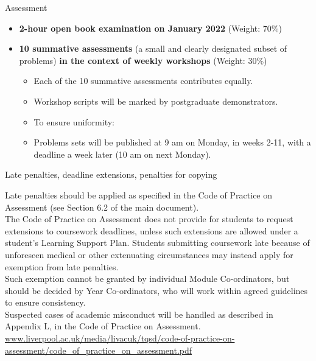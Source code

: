 \begin{frame}{Assessment}

     \begin{itemize}
        \item {\bf 2-hour open book examination on January 2022} {\color{red}(Weight: 70\%)}
        \vspace{0.2cm}
        \item {\bf 10 summative assessments} (a small and
            clearly designated subset of problems) {\bf in the context of weekly workshops} {\color{red}(Weight: 30\%)}
            \begin{itemize}
              \item Each of the 10 summative assessments contributes equally.
              \item Workshop scripts will be marked by postgraduate demonstrators.
              \item To ensure uniformity:
              \item Problems sets will be published at 9 am on Monday, in weeks 2-11, with a deadline a week later (10 am on next Monday).
            \end{itemize}
     \end{itemize}

     \begin{block001}{Late penalties, deadline extensions, penalties for copying}
     \begin{center}
     {\tiny
     Late penalties should be applied as specified in the Code of Practice on Assessment (see Section 6.2 of the main document).\\
     The Code of Practice on Assessment does not provide for students to request extensions to coursework deadlines, unless such extensions are allowed under a student’s Learning Support Plan.  Students submitting coursework late because of unforeseen medical or other extenuating circumstances may instead apply for exemption from late penalties.\\
     Such exemption cannot be granted by individual Module Co-ordinators, but should be decided by Year Co-ordinators, who will work within agreed guidelines to ensure consistency. \\
     Suspected cases of academic misconduct will be handled as described in Appendix L, in the Code of Practice on Assessment.\\
     \url{www.liverpool.ac.uk/media/livacuk/tqsd/code-of-practice-on-assessment/code\_of\_practice\_on\_assessment.pdf}\\
     }
     \end{center}
     \end{block001}



\end{frame}

